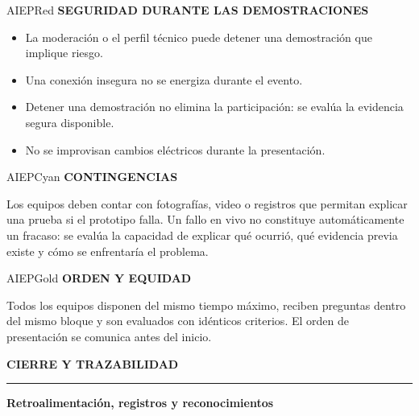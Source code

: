 \documentclass[10pt,a4paper]{article}
\newcommand{\kicker}[1]{%
  {\color{AIEPRed}\scriptsize\bfseries\MakeUppercase{#1}}\par\vspace{2.4mm}
  {\color{AIEPRed}\rule{13mm}{1.2pt}}\vspace{3mm}
}
\newcommand{\labeltext}[1]{%
  {\scriptsize\bfseries\color{AIEPSlate}\MakeUppercase{#1}}\par\vspace{1.2mm}
}
\begin{document}
\begin{softcard}{AIEPRed}
\labeltext{Seguridad durante las demostraciones}
\begin{itemize}
  \item La moderación o el perfil técnico puede detener una demostración que implique riesgo.
  \item Una conexión insegura no se energiza durante el evento.
  \item Detener una demostración no elimina la participación: se evalúa la evidencia segura disponible.
  \item No se improvisan cambios eléctricos durante la presentación.
\end{itemize}
\end{softcard}

\begin{softcard}{AIEPCyan}
\labeltext{Contingencias}
Los equipos deben contar con fotografías, video o registros que permitan explicar una prueba si
el prototipo falla. Un fallo en vivo no constituye automáticamente un fracaso: se evalúa la
capacidad de explicar qué ocurrió, qué evidencia previa existe y cómo se enfrentaría el problema.
\end{softcard}

\begin{softcard}{AIEPGold}
\labeltext{Orden y equidad}
Todos los equipos disponen del mismo tiempo máximo, reciben preguntas dentro del mismo bloque y
son evaluados con idénticos criterios. El orden de presentación se comunica antes del inicio.
\end{softcard}

\newpage
\kicker{Cierre y trazabilidad}
{\LARGE\bfseries\color{AIEPNavy} Retroalimentación, registros y reconocimientos}\par
\vspace{4mm}
\end{document}
